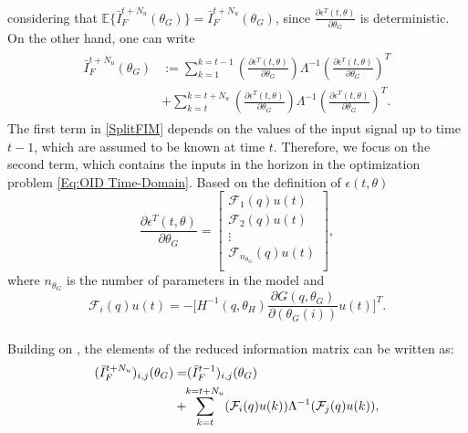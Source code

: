 \documentclass{ifacconf}
\begin{document}
considering that $\mathbb{E} \{\bar{I}_F^{t+N_u}(\theta_G)\} = \bar{I}_F^{t+N_u}(\theta_G)$, since $\frac{\partial \epsilon^T(t,\theta)}{\partial \theta_G}$ is deterministic. On the other hand, one can write
\vspace{-0.0cm}
\begin{eqnarray} \label{SplitFIM}
\begin{split}
\bar{I}_F^{t+N_u}(\theta_G) &:= \sum_{k=1}^{k = t-1}
																			\left( \frac{\partial \epsilon^T(t,\theta)}{\partial \theta_G} \right)
																			\Lambda^{-1}
																			\left( \frac{\partial \epsilon^T(t,\theta)}{\partial \theta_G} \right)^T
										\\&+
											\sum_{k=t}^{k = t+N_u}
																			\left( \frac{\partial \epsilon^T(t,\theta)}{\partial \theta_G} \right)
																			\Lambda^{-1}
																			\left( \frac{\partial \epsilon^T(t,\theta)}{\partial \theta_G} \right)^T.
\end{split}
\end{eqnarray}
\vspace{-0.0cm}
The first term in \eqref{SplitFIM} depends on the values of the input signal up to time $t-1$, which are assumed to be known at time $t$. Therefore, we focus on the second term, which contains the inputs in the horizon in the optimization problem \eqref{Eq:OID Time-Domain}.
 Based on the definition of $\epsilon(t,\theta)$
\begin{equation}
\frac{\partial \epsilon^T(t,\theta)}{\partial \theta_G} =
																	\begin{bmatrix}
																		\mathcal{F}_1(q)u(t)\\
																		\mathcal{F}_2(q)u(t)\\
																		\vdots \\
																		\mathcal{F}_{n_{\theta_G}}(q)u(t)\\
																	\end{bmatrix}
																		,
\end{equation}
where $n_{\theta_G}$ is the number of parameters in the model and
\begin{equation}
\mathcal{F}_i (q)u(t) = - \Big [ H^{-1}(q, \theta_H) \frac{\partial G(q, \theta_G)}{\partial (\theta_G(i))}u(t) \Big]^T.
\end{equation}
\\
Building on \cite{Manchester}, the elements of the reduced information matrix can be written as:
\begin{eqnarray} \label{Eq:FIMelements}
\begin{split}
(\bar{I}_F^{t+N_u})_{i,j}(\theta_G) &=\hspace{-0.1cm} (\bar{I}_F^{t-1})_{i,j}(\theta_G)\\
												&	+	\hspace{-0.1cm}\sum_{k=t}^{k = t+N_u} (\mathcal{F}_{i} (q)u(k))  \Lambda^{-1}  (\mathcal{F}_{j}(q) u(k)),
\end{split}
\end{eqnarray}
\end{document}
